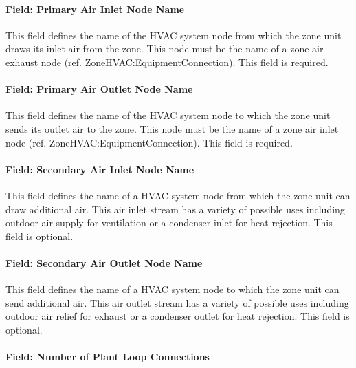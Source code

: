 \paragraph{Field: Primary Air Inlet Node Name}\label{field-primary-air-inlet-node-name-001}

This field defines the name of the HVAC system node from which the zone unit draws its inlet air from the zone. This node must be the name of a zone air exhaust node (ref. ZoneHVAC:EquipmentConnection). This field is required.

\paragraph{Field: Primary Air Outlet Node Name}\label{field-primary-air-outlet-node-name-001}

This field defines the name of the HVAC system node to which the zone unit sends its outlet air to the zone. This node must be the name of a zone air inlet node (ref. ZoneHVAC:EquipmentConnection). This field is required.

\paragraph{Field: Secondary Air Inlet Node Name}\label{field-secondary-air-inlet-node-name-002}

This field defines the name of a HVAC system node from which the zone unit can draw additional air. This air inlet stream has a variety of possible uses including outdoor air supply for ventilation or a condenser inlet for heat rejection. This field is optional.

\paragraph{Field: Secondary Air Outlet Node Name}\label{field-secondary-air-outlet-node-name-001}

This field defines the name of a HVAC system node to which the zone unit can send additional air. This air outlet stream has a variety of possible uses including outdoor air relief for exhaust or a condenser outlet for heat rejection. This field is optional.

\paragraph{Field: Number of Plant Loop Connections}\label{field-number-of-plant-loop-connections}

